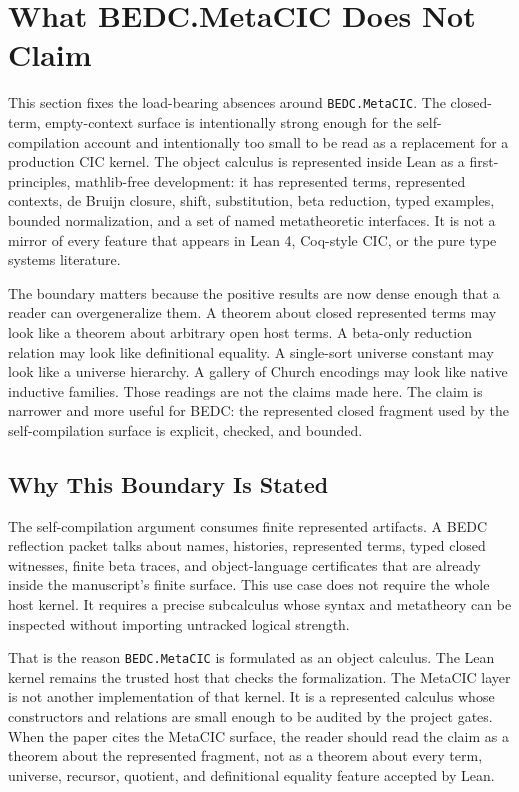 \section{What BEDC.MetaCIC Does Not Claim}
\label{sec:metacic-what-we-do-not-claim}

This section fixes the load-bearing absences around \texttt{BEDC.MetaCIC}.
The closed-term, empty-context surface is intentionally strong enough for the
self-compilation account and intentionally too small to be read as a
replacement for a production CIC kernel.  The object calculus is represented
inside Lean as a first-principles, mathlib-free development: it has
represented terms, represented contexts, de Bruijn closure, shift,
substitution, beta reduction, typed examples, bounded normalization, and a
set of named metatheoretic interfaces.  It is not a mirror of every feature
that appears in Lean 4, Coq-style CIC, or the pure type systems literature.

The boundary matters because the positive results are now dense enough that a
reader can overgeneralize them.  A theorem about closed represented terms may
look like a theorem about arbitrary open host terms.  A beta-only reduction
relation may look like definitional equality.  A single-sort universe
constant may look like a universe hierarchy.  A gallery of Church encodings
may look like native inductive families.  Those readings are not the claims
made here.  The claim is narrower and more useful for BEDC: the represented
closed fragment used by the self-compilation surface is explicit, checked,
and bounded.

\subsection{Why This Boundary Is Stated}
\label{subsec:metacic-boundary-why}

The self-compilation argument consumes finite represented artifacts.  A BEDC
reflection packet talks about names, histories, represented terms, typed
closed witnesses, finite beta traces, and object-language certificates that
are already inside the manuscript's finite surface.  This use case does not
require the whole host kernel.  It requires a precise subcalculus whose
syntax and metatheory can be inspected without importing untracked logical
strength.

That is the reason \texttt{BEDC.MetaCIC} is formulated as an object calculus.
The Lean kernel remains the trusted host that checks the formalization.  The
MetaCIC layer is not another implementation of that kernel.  It is a
represented calculus whose constructors and relations are small enough to be
audited by the project gates.  When the paper cites the MetaCIC surface, the
reader should read the claim as a theorem about the represented fragment, not
as a theorem about every term, universe, recursor, quotient, and definitional
equality feature accepted by Lean.

